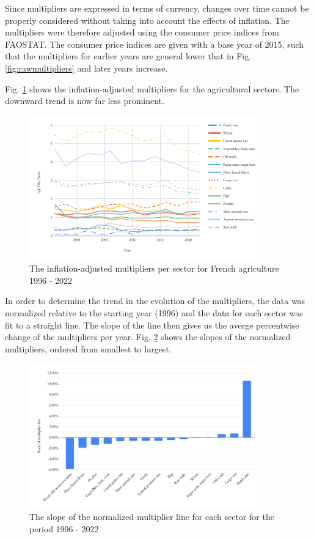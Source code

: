 \documentclass[a4paper,twoside]{article}
\begin{document}
Since multipliers are expressed in terms of currency, changes over time cannot be properly considered without taking into account the effects of inflation. The multipliers were therefore adjusted using the consumer price indices from FAOSTAT. The consumer price indices are given with a base year of 2015, such that the multipliers for earlier years are general lower that in Fig. \ref{fig:rawmultipliers} and later years increase.

Fig. \ref{fig:adjustedmultipliers} shows the inflation-adjusted multipliers for the agricultural sectors. The downward trend is now far less prominent. 

\begin{figure}[H]
\centering
\includegraphics[width=0.9\textwidth]{inflated_adjusted}
\caption{The inflation-adjusted multipliers per sector for French agriculture 1996 - 2022}\label{fig:adjustedmultipliers} 
\end{figure}

In order to determine the trend in the evolution of the multipliers, the data was normalized relative to the starting year (1996) and the data for each sector was fit to a straight line. The slope of the line then gives us the averge percentwise change of the multipliers per year. Fig. \ref{fig:slope} shows the slopes of the normalized multipliers, ordered from smallest to largest. 

\begin{figure}[H]
\centering
\includegraphics[width=0.9\textwidth]{slope}
\caption{The slope of the normalized multiplier line for each sector for the period 1996 - 2022}\label{fig:slope} 
\end{figure}
\end{document}

